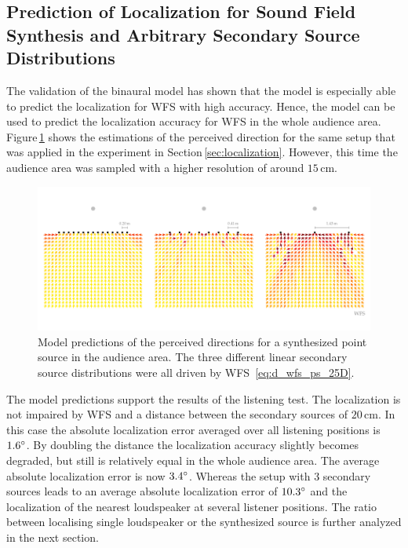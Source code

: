 \subsection{Prediction of Localization for Sound Field Synthesis and Arbitrary
Secondary Source Distributions}
\label{sec:prediction_of_localization_for_sound_field_synthesis_and_arbritrary_setups}
%
The validation of the binaural model has shown that the model is especially
able to predict the localization for \ac{WFS} with high accuracy. Hence, the model can
be used to predict the localization accuracy for \ac{WFS}
in the whole audience area. Figure\,\ref{fig:wfs_linear_model} shows the
estimations of the perceived direction for the same setup that was applied in
the experiment in Section\,\ref{sec:localization}. However, this time the audience area
was sampled with a higher resolution of around $15$\,cm.
%
\begin{figure}
    \centering
    \includegraphics{fig6_05/fig6_05}
    \caption{Model predictions of the perceived directions for a synthesized point
    source in the audience area. The three different linear secondary source
    distributions were all driven by \ac{WFS}~\protect\eqref{eq:d_wfs_ps_25D}.
    }
    \label{fig:wfs_linear_model}
\end{figure}
%
The model predictions support the results of the listening test. The
localization is not impaired by \ac{WFS} and a distance between the secondary
sources of $20$\,cm. In this case the absolute localization error averaged over
all listening positions is $1.6^\circ$. 
By doubling the distance the localization accuracy slightly becomes
degraded, but still is relatively equal in the whole audience area. The
average absolute localization error is now $3.4^\circ$.
Whereas the setup with 3 secondary sources leads to an average absolute
localization error of $10.3^\circ$ and the localization of
the nearest loudspeaker at several listener positions.
The ratio between localising single loudspeaker or the synthesized source is
further analyzed in the next section.

